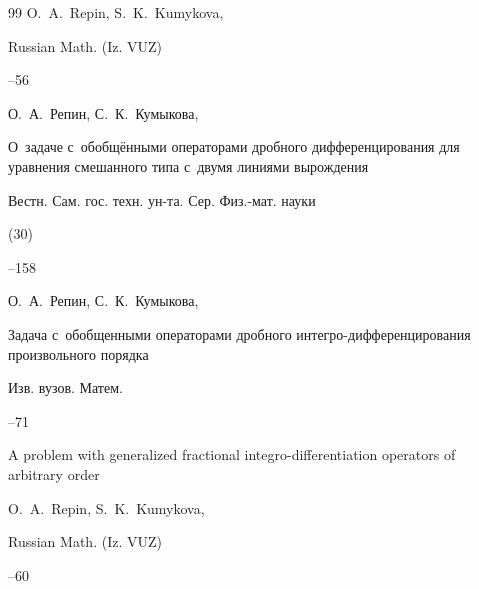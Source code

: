 \begin{thebibliography}{99}
\by O.~A.~Repin, S.~K.~Kumykova,

\jour Russian Math. (Iz. VUZ)




--56






\by О.~А.~Репин, С.~К.~Кумыкова,

\paper О~задаче с~обобщёнными операторами дробного дифференцирования для уравнения смешанного типа с~двумя линиями вырождения

\jour Вестн. Сам. гос. техн. ун-та. Сер. Физ.-мат. науки


(30)

--158






\by О.~А.~Репин, С.~К.~Кумыкова,

\paper Задача с~обобщенными операторами дробного интегро-дифференцирования произвольного порядка

\jour Изв. вузов. Матем.



--71



\transl

\paper A problem with generalized fractional integro-differentiation operators of arbitrary order

\by O.~A.~Repin, S.~K.~Kumykova,

\jour Russian Math. (Iz. VUZ)




--60



\end{thebibliography}
